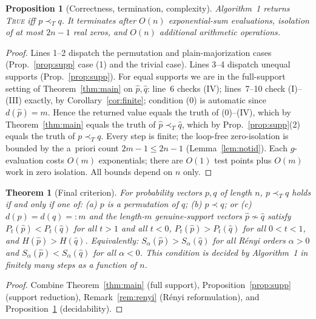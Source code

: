\documentclass{amsart}
\theoremstyle{plain}
\newtheorem{theorem}{Theorem}
\newtheorem{proposition}{Proposition}
\theoremstyle{definition}
\newcommand{\maj}{\prec}
\newcommand{\trump}{\prec_T}
\begin{document}
\begin{proposition}[Correctness, termination, complexity]\label{prop:alg}
Algorithm~1 returns \textsc{True} iff $p\trump q$. It terminates after $O(n)$
exponential-sum evaluations, isolation of at most $2n-1$ real zeros, and $O(n)$
additional arithmetic operations.
\end{proposition}
\begin{proof}
Lines 1--2 dispatch the permutation and plain-majorization cases (Prop.~\ref{prop:supp}
case (1) and the trivial case). Lines 3--4 dispatch unequal supports
(Prop.~\ref{prop:supp}). For equal supports we are in the full-support setting of
Theorem~\ref{thm:main} on $\hat p,\hat q$: line~6 checks (IV); lines~7--10 check
(I)--(III) exactly, by Corollary~\ref{cor:finite}; condition (0) is automatic since
$d(\hat p)=m$. Hence the returned value equals the truth of (0)--(IV), which by
Theorem~\ref{thm:main} equals the truth of $\hat p\trump\hat q$, which by
Prop.~\ref{prop:supp}(2) equals the truth of $p\trump q$. Every step is finite; the
loop-free zero-isolation is bounded by the a~priori count $2m-1\le2n-1$
(Lemma~\ref{lem:notid}). Each $g$-evaluation costs $O(m)$ exponentials; there are
$O(1)$ test points plus $O(m)$ work in zero isolation. All bounds depend on $n$ only.
\end{proof}

\begin{theorem}[Final criterion]\label{thm:final}
For probability vectors $p,q$ of length $n$, $p\trump q$ holds if and only if one of:
\textnormal{(a)} $p$ is a permutation of $q$; \textnormal{(b)} $p\maj q$; or
\textnormal{(c)} $d(p)=d(q)=:m$ and the length-$m$ genuine-support vectors
$\hat p\not\sim\hat q$ satisfy $P_t(\hat p)<P_t(\hat q)$ for all $t>1$ and all $t<0$,
$P_t(\hat p)>P_t(\hat q)$ for all $0<t<1$, and $H(\hat p)>H(\hat q)$. Equivalently:
$S_\alpha(\hat p)>S_\alpha(\hat q)$ for all R\'enyi orders $\alpha>0$ and
$S_\alpha(\hat p)<S_\alpha(\hat q)$ for all $\alpha<0$. This condition is decided by
Algorithm~1 in finitely many steps as a function of $n$.
\end{theorem}
\begin{proof}
Combine Theorem~\ref{thm:main} (full support), Proposition~\ref{prop:supp} (support
reduction), Remark~\ref{rem:renyi} (R\'enyi reformulation), and
Proposition~\ref{prop:alg} (decidability).
\end{proof}
\end{document}
